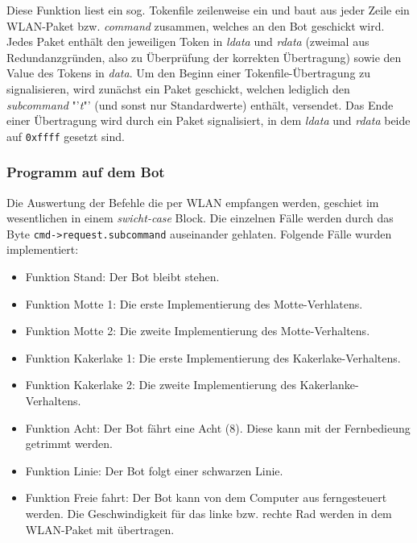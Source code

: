 \begin{itemize}
    Diese Funktion liest ein sog. Tokenfile zeilenweise ein und baut aus jeder Zeile ein WLAN-Paket bzw. \textit{command} zusammen, welches an den Bot geschickt wird. Jedes Paket enthält den jeweiligen Token in \textit{ldata} und \textit{rdata} (zweimal aus Redundanzgründen, also zu Überprüfung der korrekten Übertragung) sowie den Value des Tokens in \textit{data}. Um den Beginn einer Tokenfile-Übertragung zu signalisieren, wird zunächst ein Paket geschickt, welchen lediglich den \textit{subcommand} "'\textit{t}"' (und sonst nur Standardwerte) enthält, versendet. Das Ende einer Übertragung wird durch ein Paket signalisiert, in dem \textit{ldata} und \textit{rdata} beide auf \verb+0xffff+ gesetzt sind.
\end{itemize}


\subsubsection{Programm auf dem Bot}
\label{ctremote_bot}
Die Auswertung der Befehle die per WLAN empfangen werden, geschiet im wesentlichen
in einem \textit{swicht-case} Block. Die einzelnen Fälle werden durch das Byte 
\verb+cmd->request.subcommand+ auseinander gehlaten. Folgende Fälle wurden
implementiert:
\begin{itemize}
    \item Funktion Stand: Der Bot bleibt stehen.
    \item Funktion Motte 1: Die erste Implementierung des Motte-Verhlatens.
    \item Funktion Motte 2: Die zweite Implementierung des Motte-Verhaltens. 
    \item Funktion Kakerlake 1: Die erste Implementierung des Kakerlake-Verhaltens.
    \item Funktion Kakerlake 2: Die zweite Implementierung des Kakerlanke-Verhaltens.
    \item Funktion Acht: Der Bot fährt eine Acht (8). Diese kann mit der Fernbedieung getrimmt werden.
    \item Funktion Linie: Der Bot folgt einer schwarzen Linie.
    \item Funktion Freie fahrt: Der Bot kann von dem Computer aus ferngesteuert werden.
        Die Geschwindigkeit für das linke bzw. rechte Rad werden in dem WLAN-Paket mit
        übertragen.
\end{itemize}


